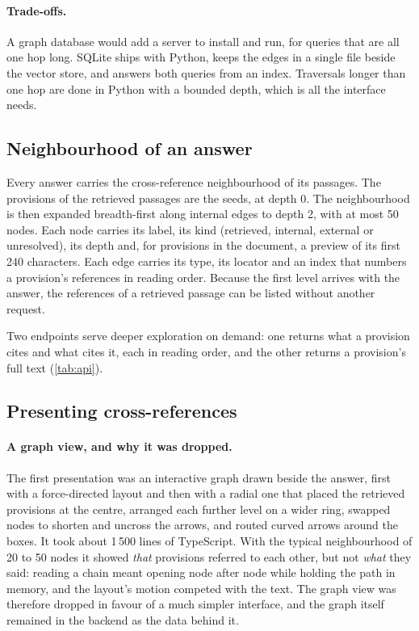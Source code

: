 \paragraph{Trade-offs.} A graph database would add a server to install and
run, for queries that are all one hop long. SQLite ships with Python, keeps
the edges in a single file beside the vector store, and answers both queries
from an index. Traversals longer than one hop are done in Python with a
bounded depth, which is all the interface needs.

\subsection{Neighbourhood of an answer}

Every answer carries the cross-reference neighbourhood of its passages. The
provisions of the retrieved passages are the seeds, at depth 0. The
neighbourhood is then expanded breadth-first along internal edges to depth 2,
with at most 50 nodes. Each node carries its label, its kind (retrieved,
internal, external or unresolved), its depth and, for provisions in the
document, a preview of its first 240 characters. Each edge carries its type,
its locator and an index that numbers a provision's references in reading
order. Because the first level arrives with the answer, the references of a
retrieved passage can be listed without another request.

Two endpoints serve deeper exploration on demand: one returns what a
provision cites and what cites it, each in reading order, and the other
returns a provision's full text (\cref{tab:api}).

\subsection{Presenting cross-references}

\paragraph{A graph view, and why it was dropped.} The first presentation was
an interactive graph drawn beside the answer, first with a force-directed
layout and then with a radial one that placed the retrieved provisions at the
centre, arranged each further level on a wider ring, swapped nodes to shorten
and uncross the arrows, and routed curved arrows around the boxes. It took
about 1\,500 lines of TypeScript. With the typical neighbourhood of 20 to 50
nodes it showed \emph{that} provisions referred to each other, but not
\emph{what} they said: reading a chain meant opening node after node while
holding the path in memory, and the layout's motion competed with the text.
The graph view was therefore dropped in favour of a much simpler interface,
and the graph itself remained in the backend as the data behind it.

